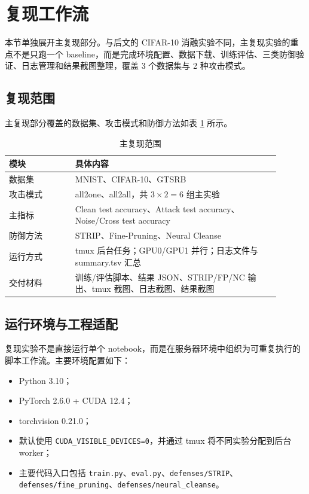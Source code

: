 \documentclass[UTF8,zihao=-4]{ctexart}
\begin{document}
\section{复现工作流}

本节单独展开主复现部分。与后文的 CIFAR-10 消融实验不同，主复现实验的重点不是只跑一个 baseline，而是完成环境配置、数据下载、训练评估、三类防御验证、日志管理和结果截图整理，覆盖 3 个数据集与 2 种攻击模式。

\subsection{复现范围}

主复现部分覆盖的数据集、攻击模式和防御方法如表 \ref{tab:teammate_scope} 所示。

\begin{table}[H]
\centering
\caption{主复现范围}
\label{tab:teammate_scope}
\begin{tabular}{p{0.22\linewidth}p{0.68\linewidth}}
\toprule
模块 & 具体内容 \\
\midrule
数据集 & MNIST、CIFAR-10、GTSRB \\
攻击模式 & all2one、all2all，共 $3\times2=6$ 组主实验 \\
主指标 & Clean test accuracy、Attack test accuracy、Noise/Cross test accuracy \\
防御方法 & STRIP、Fine-Pruning、Neural Cleanse \\
运行方式 & tmux 后台任务；GPU0/GPU1 并行；日志文件与 summary.tsv 汇总 \\
交付材料 & 训练/评估脚本、结果 JSON、STRIP/FP/NC 输出、tmux 截图、日志截图、结果截图 \\
\bottomrule
\end{tabular}
\end{table}

\subsection{运行环境与工程适配}

复现实验不是直接运行单个 notebook，而是在服务器环境中组织为可重复执行的脚本工作流。主要环境配置如下：

\begin{itemize}
    \item Python 3.10；
    \item PyTorch 2.6.0 + CUDA 12.4；
    \item torchvision 0.21.0；
    \item 默认使用 \texttt{CUDA\_VISIBLE\_DEVICES=0}，并通过 tmux 将不同实验分配到后台 worker；
    \item 主要代码入口包括 \texttt{train.py}、\texttt{eval.py}、\texttt{defenses/STRIP}、\texttt{defenses/fine\_pruning}、\texttt{defenses/neural\_cleanse}。
\end{itemize}
\end{document}
